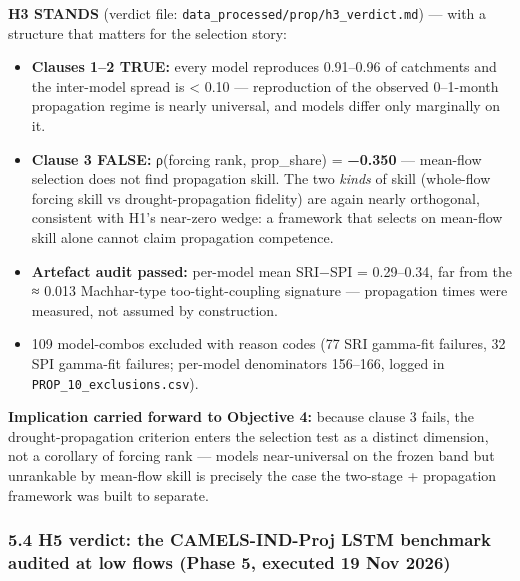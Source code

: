\documentclass[
  english,
  11pt,
]{article}
\providecommand{\tightlist}{%
  \setlength{\itemsep}{0pt}\setlength{\parskip}{0pt}}
\begin{document}
\textbf{H3 STANDS} (verdict file:
\texttt{data\_processed/prop/h3\_verdict.md}) --- with a structure that
matters for the selection story:

\begin{itemize}
\tightlist
\item
  \textbf{Clauses 1--2 TRUE:} every model reproduces 0.91--0.96 of
  catchments and the inter-model spread is \textless{} 0.10 ---
  reproduction of the observed 0--1-month propagation regime is nearly
  universal, and models differ only marginally on it.
\item
  \textbf{Clause 3 FALSE:} ρ(forcing rank, prop\_share) =
  \textbf{−0.350} --- mean-flow selection does not find propagation
  skill. The two \emph{kinds} of skill (whole-flow forcing skill vs
  drought-propagation fidelity) are again nearly orthogonal, consistent
  with H1's near-zero wedge: a framework that selects on mean-flow skill
  alone cannot claim propagation competence.
\item
  \textbf{Artefact audit passed:} per-model mean
  \textbar SRI−SPI\textbar{} = 0.29--0.34, far from the ≈ 0.013
  Machhar-type too-tight-coupling signature --- propagation times were
  measured, not assumed by construction.
\item
  109 model-combos excluded with reason codes (77 SRI gamma-fit
  failures, 32 SPI gamma-fit failures; per-model denominators 156--166,
  logged in \texttt{PROP\_10\_exclusions.csv}).
\end{itemize}

\textbf{Implication carried forward to Objective 4:} because clause 3
fails, the drought-propagation criterion enters the selection test as a
distinct dimension, not a corollary of forcing rank --- models
near-universal on the frozen band but unrankable by mean-flow skill is
precisely the case the two-stage + propagation framework was built to
separate.

\subsubsection{5.4 H5 verdict: the CAMELS-IND-Proj LSTM benchmark
audited at low flows (Phase 5, executed 19 Nov
2026)}\label{h5-verdict-the-camels-ind-proj-lstm-benchmark-audited-at-low-flows-phase-5-executed-19-nov-2026}
\end{document}
